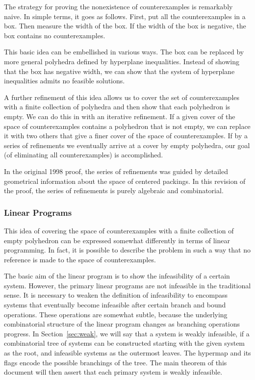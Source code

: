 The strategy for proving the nonexistence of counterexamples is
remarkably naive. In simple terms, it goes as follows.  First, put
all the counterexamples in a box. Then measure the width of the
box. If the width of the box is negative, the box contains no
counterexamples.

This basic idea can be embellished in various ways.  The box can
be replaced by more general polyhedra defined by hyperplane
inequalities.  Instead of showing that the box has negative width,
we can show that the system of hyperplane inequalities admits no
feasible solutions.

A further refinement of this idea allows us to cover the set of
counterexamples with a finite collection of polyhedra and then
show that each polyhedron is empty.  We can do this in with an
iterative refinement.  If a given cover of the space of
counterexamples contains a polyhedron that is not empty, we can
replace it with two others that give a finer cover of the space of
counterexamples.  If by a series of  refinements we eventually
arrive at a cover by empty polyhedra, our goal (of eliminating all
counterexamples) is accomplished.

In the original 1998 proof, the series of refinements was guided
by detailed geometrical information about the space of centered
packings.  In this revision of the proof, the series of
refinements is purely algebraic and combinatorial.

\subsubsection{Linear Programs}

This idea of covering the space of counterexamples with a finite
collection of empty polyhedron can be expressed somewhat
differently in terms of linear programming.  In fact, it is
possible to describe the problem in such a way that no reference
is made to the space of counterexamples.

The basic aim of the linear program is to show the infeasibility
of a certain system.  However, the primary linear programs are not
infeasible in the traditional sense.  It is necessary to weaken
the definition of infeasibility to encompass systems that
eventually become infeasible after certain branch and bound
operations.  These operations are somewhat subtle, because the
underlying combinatorial structure of the linear program changes
as branching operations progress.   In Section~\ref{sec:weak}, we
will say that a system is weakly infeasible, if a combinatorial
tree of systems can be constructed starting with the given system
as the root, and infeasible systems as the outermost leaves.  The
hypermap and its flags encode the possible branchings of the tree.
The main theorem of this document will then assert that each
primary system is weakly infeasible.


